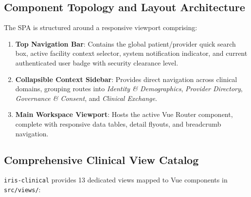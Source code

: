 \subsection{Component Topology and Layout Architecture}

The SPA is structured around a responsive viewport comprising:
\begin{enumerate}
    \item \textbf{Top Navigation Bar}: Contains the global patient/provider quick search box, active facility context selector, system notification indicator, and current authenticated user badge with security clearance level.
    \item \textbf{Collapsible Context Sidebar}: Provides direct navigation across clinical domains, grouping routes into \textit{Identity \& Demographics}, \textit{Provider Directory}, \textit{Governance \& Consent}, and \textit{Clinical Exchange}.
    \item \textbf{Main Workspace Viewport}: Hosts the active Vue Router component, complete with responsive data tables, detail flyouts, and breadcrumb navigation.
\end{enumerate}

\subsection{Comprehensive Clinical View Catalog}

\texttt{iris-clinical} provides 13 dedicated views mapped to Vue components in \texttt{src/views/}:

